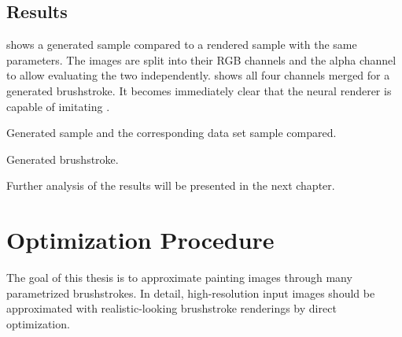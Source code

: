 \subsection{Results}
 shows a generated sample compared to a rendered sample with the same parameters.
The images are split into their RGB channels and the alpha channel to allow evaluating the two independently.
 shows all four channels merged for a generated brushstroke.
It becomes immediately clear that the neural renderer is capable of imitating .
\begin{marginfigure}
    \resizebox{\textwidth}{!}{
        
    }
    \caption[]{Generated sample and the corresponding data set sample compared.}
\end{marginfigure}
\begin{marginfigure}
    \resizebox{\textwidth}{!}{
        
    }
    \caption[]{Generated brushstroke.}
\end{marginfigure}

Further analysis of the results will be presented in the next chapter.


\section{Optimization Procedure}
The goal of this thesis is to approximate painting images through many parametrized brushstrokes.
In detail, high-resolution input images should be approximated with realistic-looking brushstroke renderings by direct optimization.

